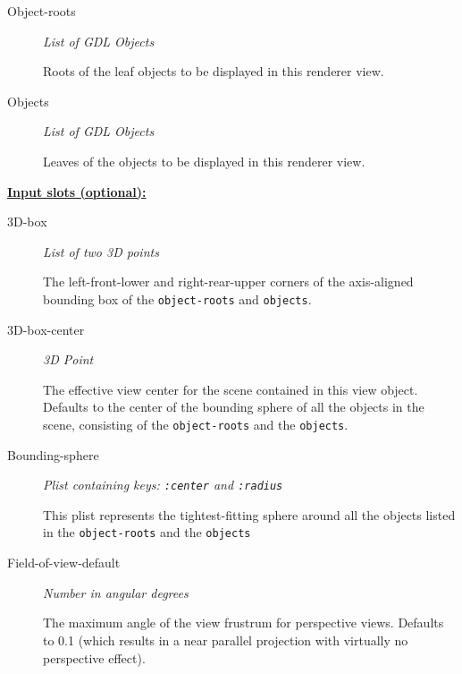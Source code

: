\documentclass [11pt]{book}
\begin{document}
\begin{itemize}
\begin{description}

\item [Object-roots]
\emph{List of GDL Objects}

 Roots of the leaf objects to be displayed in this renderer view.




\item [Objects]
\emph{List of GDL Objects}

 Leaves of the objects to be displayed in this renderer view.




\end{description}






\textbf{
\underline{Input slots (optional):}}

\begin{description}

\item [3D-box]
\emph{List of two 3D points}

 The left-front-lower and right-rear-upper corners of the axis-aligned bounding
box of the \texttt{object-roots} and \texttt{objects}.




\item [3D-box-center]
\emph{3D Point}

 The effective view center for the scene contained in this view object. Defaults to the center of the bounding sphere of all
the objects in the scene, consisting of the \texttt{object-roots} and the \texttt{objects}.




\item [Bounding-sphere]
\emph{Plist containing keys: \texttt{:center} and \texttt{:radius}}

 This plist represents the tightest-fitting sphere
around all the objects listed in the \texttt{object-roots} and the \texttt{objects}




\item [Field-of-view-default]
\emph{Number in angular degrees}

 The maximum angle of the view frustrum for perspective views.
Defaults to 0.1 (which results in a near parallel projection with virtually no perspective effect).





\end{description}
\end{itemize}
\end{document}
